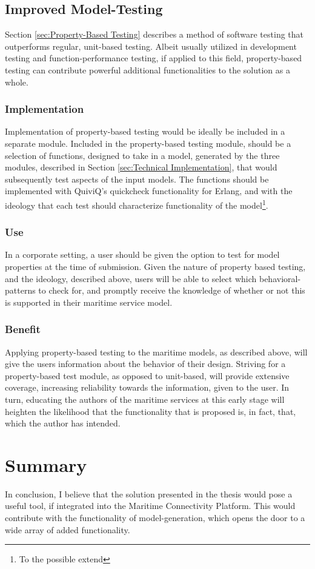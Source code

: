 \subsection{Improved Model-Testing}
Section \ref{sec:Property-Based Testing} describes a method of software testing that outperforms regular, unit-based testing. Albeit usually utilized in development testing and function-performance testing, if applied to this field, property-based testing can contribute powerful additional functionalities to the solution as a whole. 
\subsubsection{Implementation}
Implementation of property-based testing would be ideally be included in a separate module. Included in the property-based testing module, should be a selection of functions, designed to take in a model, generated by the three modules, described in Section \ref{sec:Technical Implementation}, that would subsequently test aspects of the input models. The functions should be implemented with QuiviQ's quickcheck functionality for Erlang, and with the ideology that each test should characterize  functionality of the model\footnote{To the possible extend}.
\subsubsection{Use}
In a corporate setting, a user should be given the option to test for model properties at the time of submission. Given the nature of property based testing, and the ideology, described above, users will be able to select which behavioral-patterns to check for, and promptly receive the knowledge of whether or not this is supported in their maritime service model.
\subsubsection{Benefit}
Applying property-based testing to the maritime models, as described above, will give the users information about the behavior of their design. Striving for a property-based test module, as opposed to unit-based, will provide extensive coverage, increasing reliability towards the information, given to the user. In turn, educating the authors of the maritime services at this early stage will heighten the likelihood that the functionality that is proposed is, in fact, that, which the author has intended.
\section{Summary}
In conclusion, I believe that the solution presented in the thesis would pose a useful tool, if integrated into the Maritime Connectivity Platform. This would contribute with the functionality of model-generation, which opens the door to a wide array of added functionality. 

